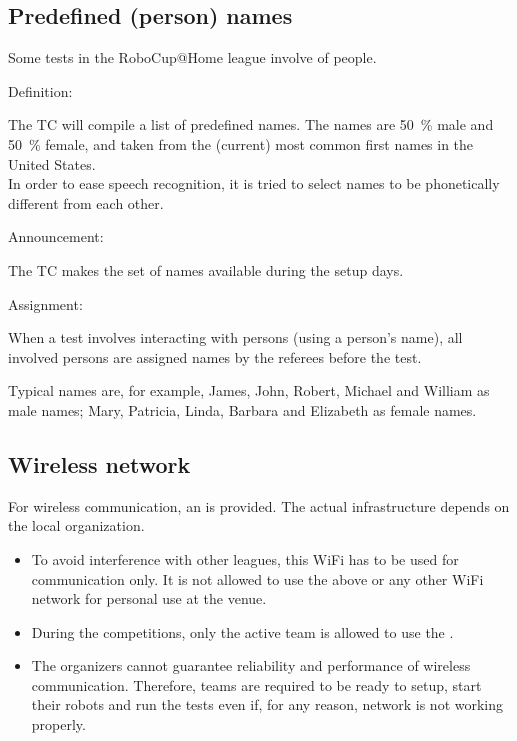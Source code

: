 \subsection{Predefined (person) names}\label{rule:scenario_names}

Some tests in the RoboCup@Home league involve  of people. 

\begin{enumerate}
	{\bf\item Definition:} The TC will compile a list of \NumNames predefined names. The names are \SI{50}{\percent} male and \SI{50}{\percent} female, and taken from the (current) most common first names in the United States.\\
	In order to ease speech recognition, it is tried to select names to be phonetically different from each other.

	{\bf\item Announcement:} The TC makes the set of names available during the setup days.
	{\bf\item Assignment:} When a test involves interacting with persons (using a person's name), all involved persons are assigned names by the referees before the test. 
\end{enumerate}

Typical names are, for example, James, John, Robert, Michael and William as male names; Mary, Patricia, Linda, Barbara and Elizabeth as female names.


\subsection{Wireless network}\label{rule:scenario_wifi}

For wireless communication, an  is provided. The actual infrastructure depends on the local organization. 

\begin{itemize}
	\item To avoid interference with other leagues, this WiFi has to be used for communication only. It is not allowed to use the above or any other WiFi network for personal use at the venue.
	\item During the competitions, only the active team is allowed to use the . 
	\item The organizers cannot guarantee reliability and performance of wireless communication. Therefore, teams are required to be ready to setup, start their robots and run the tests even if, for any reason, network is not working properly.
\end{itemize}

